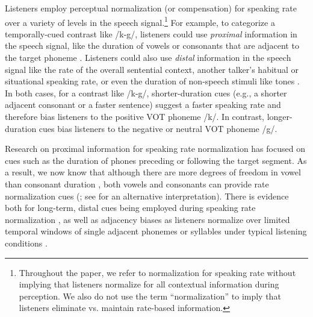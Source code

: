 \documentclass[preprint]{JASA}
\begin{document}
Listeners employ perceptual normalization (or compensation) for speaking rate over a variety of levels in the speech signal.\footnote{Throughout the paper, we refer to normalization for speaking rate without implying that listeners normalize for all contextual information during perception. We also do not use the term ``normalization'' to imply that listeners eliminate vs. maintain rate-based information.} For example, to categorize a temporally-cued contrast like /k-g/, listeners could use \textit{proximal} information in the speech signal, like the duration of vowels or consonants that are adjacent to the target phoneme 
\citep{diehlAuditoryBasisStimulus1989,millerEffectsLateroccurringInformation1979,newmanPerceptualNormalizationSpeaking1996,summerfieldArticulatoryRatePerceptual1981}. Listeners could also use \textit{distal} information in the speech signal like the rate of the overall sentential context, another talker's habitual or situational speaking rate, or even the duration of non-speech stimuli like tones \citep{maslowskiHowTrackingHabitual2019, newmanPerceptualNormalizationSpeaking2009,reinischSpeakerspecificProcessingLocal2016,wadePerceptualEffectsPreceding2005}. In both cases, for a contrast like /k-g/, shorter-duration cues (e.g., a shorter adjacent consonant or a faster sentence) suggest a faster speaking rate and therefore bias listeners to the positive VOT phoneme /k/. In contrast, longer-duration cues bias listeners to the negative or neutral VOT phoneme /g/. 

Research on proximal information for speaking rate normalization has focused on cues such as the duration of phones preceding or following the target segment. As a result, we now know that although there are more degrees of freedom in vowel than consonant duration \citep{crystalSegmentalDurationsConnected1988}, both vowels and consonants can provide rate normalization cues (\citealt{diehlAuditoryBasisStimulus1989,summerfieldArticulatoryRatePerceptual1981}; see \citealt{toscanoCueintegrationContextEffects2012} for an alternative interpretation). There is evidence both for long-term, distal cues being employed during speaking rate normalization \citep{baese-berkLongtermTemporalTracking2014,maslowskiHowTrackingHabitual2019,reinischSpeakingRateProximal2011,kosemNeuralEntrainmentDetermines2018}, as well as adjacency biases as listeners normalize over limited temporal windows of single adjacent phonemes or syllables under typical listening conditions \citep{newmanPerceptualNormalizationSpeaking1996,sawuschPerceptualNormalizationSpeaking2000}. 
\end{document}
